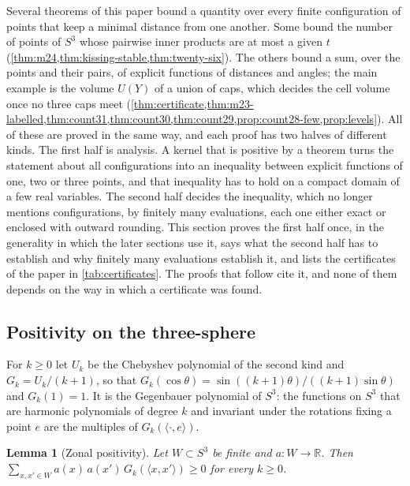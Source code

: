 \documentclass[11pt,reqno]{amsart}
\renewcommand{\_}{\origunderscore\allowbreak}
\numberwithin{equation}{section}
\theoremstyle{plain}
\newtheorem{lem}[thm]{Lemma}
\theoremstyle{definition}
\theoremstyle{remark}
\begin{document}
Several theorems of this paper bound a quantity over every finite
configuration of points that keep a minimal distance from one another.
Some bound the number of points of $S^3$ whose pairwise inner products are
at most a given $t$ (\cref{thm:m24,thm:kissing-stable,thm:twenty-six}).
The others bound a sum, over the points and their pairs, of explicit
functions of distances and angles; the main example is the volume $U(Y)$
of a union of caps, which decides the cell volume once no three caps meet
(\cref{thm:certificate,thm:m23-labelled,thm:count31,thm:count30,thm:count29,prop:count28-few,prop:levels}).
All of these are proved in the same way, and each proof has two halves of
different kinds. The first half is analysis. A kernel that is positive by
a theorem turns the statement about all configurations into an inequality
between explicit functions of one, two or three points, and that
inequality has to hold on a compact domain of a few real variables. The
second half decides the inequality, which no longer mentions
configurations, by finitely many evaluations, each one either exact or
enclosed with outward rounding. This section proves the first half once,
in the generality in which the later sections use it, says what the
second half has to establish and why finitely many evaluations establish
it, and lists the certificates of the paper in \cref{tab:certificates}.
The proofs that follow cite it, and none of them depends on the way in
which a certificate was found.

\subsection{Positivity on the three-sphere}\label{sec:kernels-positivity}

For $k\ge0$ let $U_k$ be the Chebyshev polynomial of the second kind and
$G_k=U_k/(k+1)$, so that
$G_k(\cos\theta)=\sin((k+1)\theta)/((k+1)\sin\theta)$ and $G_k(1)=1$. It
is the Gegenbauer polynomial of $S^3$: the functions on $S^3$ that are
harmonic polynomials of degree $k$ and invariant under the rotations
fixing a point $e$ are the multiples of $G_k(\langle\cdot,e\rangle)$.

\begin{lem}[Zonal positivity]\label{lem:zonal-psd}
Let $W\subset S^3$ be finite and $a\colon W\to\mathbb{R}$. Then
$\sum_{x,x'\in W}a(x)\,a(x')\,G_k(\langle x,x'\rangle)\ge0$ for every
$k\ge0$.
\end{lem}
\end{document}
